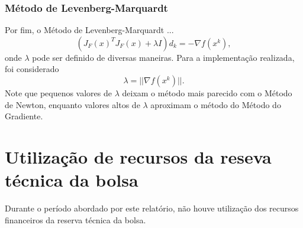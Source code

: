 \documentclass[a4paper,12pt]{article}
\begin{document}
\subsubsection*{Método de Levenberg-Marquardt}
Por fim, o Método de Levenberg-Marquardt ...
$$(J_F(x)^T J_F(x) + \lambda I) d_k = - \nabla f(x^k),$$
onde $\lambda$ pode ser definido de diversas maneiras. Para a implementação realizada, foi considerado $$\lambda = ||\nabla f(x^k)||.$$ 
Note que pequenos valores de $\lambda$ deixam o método mais parecido com o Método de Newton, enquanto valores altos de $\lambda$ aproximam o método do Método do Gradiente.




\newpage

\section*{Utilização de recursos da reseva técnica da bolsa}

Durante o período abordado por este relatório, não houve utilização dos recursos financeiros da reserva técnica da bolsa.

\newpage

\printbibliography
\end{document}
